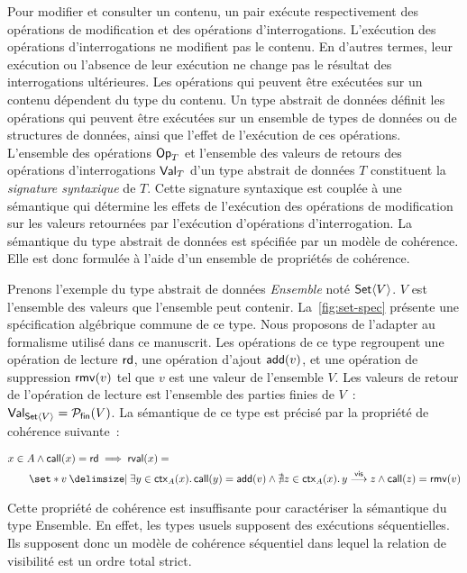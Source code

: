 Pour modifier et consulter un contenu, un pair exécute respectivement des opérations de modification et des opérations d'interrogations.
L'exécution des opérations d'interrogations ne modifient pas le contenu.
En d'autres termes, leur exécution ou l'absence de leur exécution ne change pas le résultat des interrogations ultérieures.
Les opérations qui peuvent être exécutées sur un contenu dépendent du type du contenu.
Un type abstrait de données définit les opérations qui peuvent être exécutées sur un ensemble de types de données ou de structures de données, ainsi que l'effet de l'exécution de ces opérations.
L'ensemble des opérations $\trm{Op}_T$ et l'ensemble des valeurs de retours des opérations d'interrogations $\trm{Val}_T$ d'un type abstrait de données $T$ constituent la \emph{signature syntaxique} de $T$.
Cette signature syntaxique est couplée à une sémantique qui détermine les effets de l'exécution des opérations de modification sur les valeurs retournées par l'exécution d'opérations d'interrogation.
La sémantique du type abstrait de données est spécifiée par un modèle de cohérence.
Elle est donc formulée à l'aide d'un ensemble de propriétés de cohérence.

Prenons l'exemple du type abstrait de données \emph{Ensemble} noté $\trm{Set}\tuple*{V}$.
$V$ est l'ensemble des valeurs que l'ensemble peut contenir.
La~\autoref{fig:set-spec} présente une spécification algébrique \autocite{wirsing1990_algebraicspec} commune de ce type.
Nous proposons de l'adapter au formalisme utilisé dans ce manuscrit.
Les opérations de ce type regroupent une opération de lecture $\trm{rd}$, une opération d'ajout $\trm{add}(v)$, et une opération de suppression $\trm{rmv}(v)$ tel que $v$ est une valeur de l'ensemble $V$.
Les valeurs de retour de l'opération de lecture est l'ensemble des parties finies de $V$~: $\trm{Val}_{\trm{Set}\tuple*{V}} = \powerfset{V}$.
La sémantique de ce type est précisé par la propriété de cohérence suivante~:

\begin{equation}\begin{split}\label{eq:add-win-set}
\MoveEqLeft x \in A \land \trm{call}(x) = \trm{rd} \implies \trm{rval}(x) =\\
    &\set*{v \given \exists y \in \trm{ctx}_A(x) \qsep \trm{call}(y) = \trm{add}(v) \land \nexists z \in \trm{ctx}_A(x) \qsep y \vis z \land \trm{call}(z) = \trm{rmv}(v)}
\end{split}\end{equation}

Cette propriété de cohérence est insuffisante pour caractériser la sémantique du type Ensemble.
En effet, les types usuels supposent des exécutions séquentielles.
Ils supposent donc un modèle de cohérence séquentiel dans lequel la relation de visibilité est un ordre total strict.

